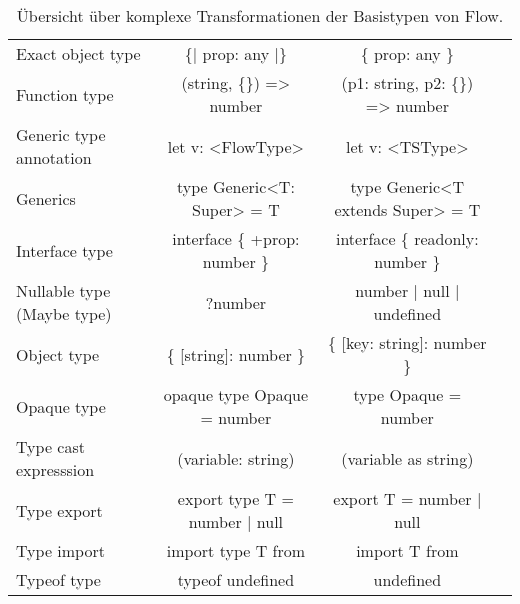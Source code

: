 \begin{table}[tbh]
  \footnotesize
  \begin{tabu} to 
    \midrule
         &                &                & {} \\
    \midrule
    Exact object type          & \{| prop: any |\}                &   \{ prop: any \}                      & {} \\
    Function type              & (string, \{\}) => number         &   (p1: string, p2: \{\}) => number     & {} \\
    Generic type annotation    & let v: <{}FlowType>{}            &   let v: <{}TSType>{}                  & {} \\
    Generics                   & type Generic<{}T: Super> = T     &   type Generic<{}T extends Super> = T  & {} \\
    Interface type             & interface \{ +prop: number \}    &   interface \{ readonly: number \}     & {} \\
    Nullable type (Maybe type) & ?number                          &   number | null | undefined            & {} \\
    Object type                & \{ {[}string{]}: number \}       &   \{ {[}key: string{]}: number \}      & {} \\
    Opaque type                & opaque type Opaque = number      &   type Opaque = number                 & {} \\
    Type cast expresssion      & (variable: string)               &   (variable as string)                 & {} \\
    Type export                & export type T = number | null    &   export T = number | null             & {} \\
    Type import                & import type T from  &   import T from           & {} \\
    Typeof type                & typeof undefined                 &   undefined                            & {} \\
    \midrule
  \end{tabu}
  \caption{Übersicht über komplexe Transformationen der Basistypen von Flow.}
  \label{tab:transformation-base-types-complex}
\end{table}
